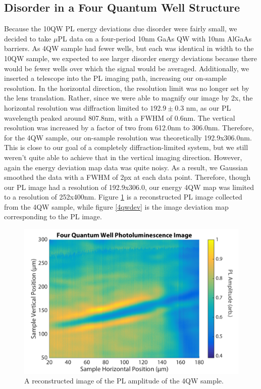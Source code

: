 \subsection{Disorder in a Four Quantum Well Structure}
Because the 10QW PL energy deviations due disorder were fairly small, we decided to take $\mu$PL data on a four-period 10nm GaAs QW with 10nm AlGaAs barriers. As 4QW sample had fewer wells, but each was identical in width to the 10QW sample, we expected to see larger disorder energy deviations because there would be fewer wells over which the signal would be averaged. Additionally, we inserted a telescope into the PL imaging path, increasing our on-sample resolution. In the horizontal direction, the resolution limit was no longer set by the lens translation. Rather, since we were able to magnify our image by 2x, the horizontal resolution was diffraction limited to $192.9\pm0.3$ nm, as our PL wavelength peaked around 807.8nm, with a FWHM of 0.6nm. The vertical resolution was increased by a factor of two from 612.0nm to 306.0nm. Therefore, for the 4QW sample, our on-sample resolution was theoretically 192.9x306.0nm. This is close to our goal of a completely diffraction-limited system, but we still weren't quite able to achieve that in the vertical imaging direction. However, again the energy deviation map data was quite noisy. As a result, we Gaussian smoothed the data with a FWHM of 2px at each data point. Therefore, though our PL image had a resolution of 192.9x306.0, our energy 4QW map was limited to a resolution of 252x400nm. Figure \ref{4qwimg} is a reconstructed PL image collected from the 4QW sample, while figure \ref{4qwdev} is the image deviation map corresponding to the PL image. 
\newpage
\begin{figure}[h!]
\centering
\includegraphics[width = .6\textwidth]{4QW_Img.png}
\caption{ \doublespacing A reconstructed image of the PL amplitude of the 4QW sample.}
\label{4qwimg}
\end{figure}
